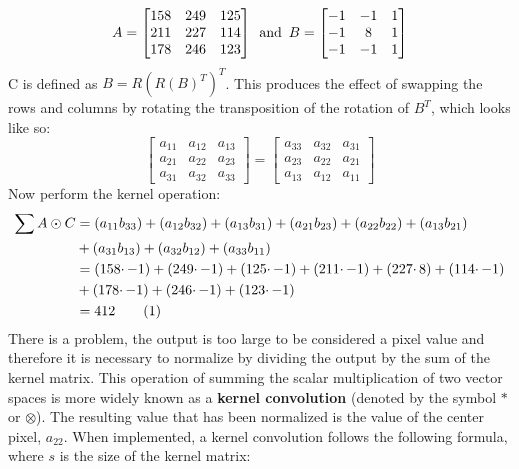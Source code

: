 \documentclass[11pt]{article}
\newcommand\numberthis{\addtocounter{equation}{1}\tag{\theequation}}%
\begin{document}
{ \small
\begin{equation}\label{equ:matrixKernelSetup}
	A=
	\begin{bmatrix}
	158 & 249 & 125\\
	211 & 227 & 114\\
	178 & 246 & 123
	\end{bmatrix}
	\text{\hspace{5pt}and\hspace{5pt}}
	B=
	\begin{bmatrix}
	-1 & -1 & 1 \\
	-1 &  8 & 1 \\
	-1 & -1 & 1
	\end{bmatrix}
\end{equation}
}
C is defined as $B=R(R(B)^T)^T$. This produces the effect of swapping the rows and columns by rotating the transposition of the rotation of $B^T$, which looks like so:
{ \small
	\begin{equation}\label{equ:matrixKernelRotate}
	\begin{bmatrix}
	a_{11} & a_{12} & a_{13}\\
	a_{21} & a_{22} & a_{23}\\
	a_{31} & a_{32} & a_{33}
	\end{bmatrix}
	=
	\begin{bmatrix}
	a_{33} & a_{32} & a_{31}\\
	a_{23} & a_{22} & a_{21}\\
	a_{13} & a_{12} & a_{11}
	\end{bmatrix}
	\end{equation}
}
Now perform the kernel operation:
{ \small
	\begin{align*}
	\sum A\odot C &=	(a_{11}b_{33}) + (a_{12}b_{32}) + (a_{13}b_{31}) + (a_{21}b_{23}) + (a_{22}b_{22}) + (a_{13}b_{21})\\
				  &+ (a_{31}b_{13}) + (a_{32}b_{12}) + (a_{33}b_{11})\\
			  	  &= (158\cdotp -1)+(249\cdotp -1)+(125\cdotp -1) + (211\cdotp -1)+(227\cdotp 8)+(114\cdotp -1)\\
			  	  &+ (178\cdotp -1)+(246\cdotp -1)+(123\cdotp -1)\\
			  	  &=  412 \numberthis \label{equ:matrixKernelSolve}
	\end{align*}
}
There is a problem, the output is too large to be considered a pixel value and therefore it is necessary to normalize by dividing the output by the sum of the kernel matrix. This operation of summing the scalar multiplication of two vector spaces is more widely known as a \textbf{kernel convolution} (denoted by the symbol $*$ or $\otimes$). The resulting value that has been normalized is the value of the center pixel, $a_{22}$. When implemented, a kernel convolution follows the following formula, where $s$ is the size of the kernel matrix:
\end{document}
